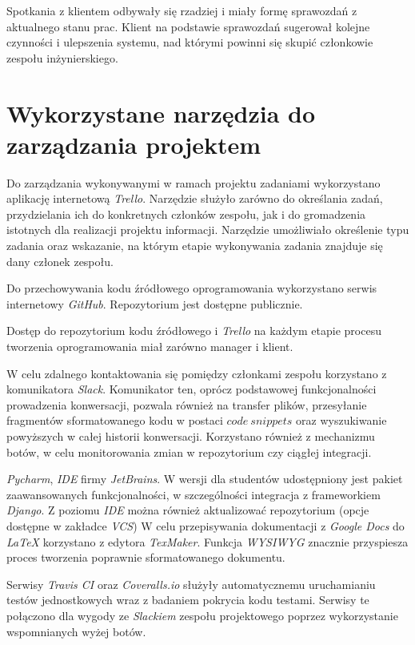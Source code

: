 \documentclass[pdflatex,11pt]{../aghdoc_version2}
\begin{document}
Spotkania z klientem odbywały się rzadziej i miały formę sprawozdań z aktualnego stanu
prac. Klient na podstawie sprawozdań sugerował kolejne czynności i ulepszenia systemu,
nad którymi powinni się skupić członkowie zespołu inżynierskiego.

\newpage
\section{Wykorzystane narzędzia do zarządzania projektem}
Do zarządzania wykonywanymi w ramach projektu zadaniami wykorzystano aplikację
internetową \textit{Trello}. Narzędzie służyło zarówno do określania zadań, przydzielania ich do
konkretnych członków zespołu, jak i do gromadzenia istotnych dla realizacji projektu
informacji. Narzędzie umożliwiało określenie typu zadania oraz wskazanie, na którym etapie
wykonywania zadania znajduje się dany członek zespołu.

Do przechowywania kodu źródłowego oprogramowania wykorzystano serwis internetowy
\textit{GitHub}. Repozytorium jest dostępne publicznie.

Dostęp do repozytorium kodu źródłowego i \textit{Trello} na każdym etapie procesu tworzenia
oprogramowania miał zarówno manager i klient. 

W celu zdalnego kontaktowania się pomiędzy członkami zespołu korzystano z
komunikatora \textit{Slack}. Komunikator ten, oprócz podstawowej funkcjonalności prowadzenia
konwersacji, pozwala również na transfer plików, przesyłanie fragmentów sformatowanego
kodu w postaci $code \ snippets$ oraz wyszukiwanie powyższych w całej historii konwersacji.
Korzystano również z mechanizmu botów, w celu monitorowania zmian w repozytorium czy ciągłej integracji.

\textit{Pycharm}, \textit{IDE} firmy \textit{JetBrains}. W wersji dla studentów udostępniony jest pakiet
zaawansowanych funkcjonalności, w szczególności integracja z frameworkiem \textit{Django}. Z
poziomu \textit{IDE} można również aktualizować repozytorium (opcje dostępne w zakładce \textit{VCS})
W celu przepisywania dokumentacji z \textit{Google Docs} do \textit{LaTeX} korzystano z edytora
\textit{TexMaker}. Funkcja \textit{WYSIWYG} znacznie przyspiesza proces tworzenia poprawnie
sformatowanego dokumentu.

Serwisy \textit{Travis CI} oraz \textit{Coveralls.io} służyły automatycznemu uruchamianiu testów jednostkowych wraz z badaniem pokrycia kodu testami. Serwisy te połączono dla wygody ze \textit{Slackiem} zespołu projektowego poprzez wykorzystanie wspomnianych wyżej botów.
\end{document}
